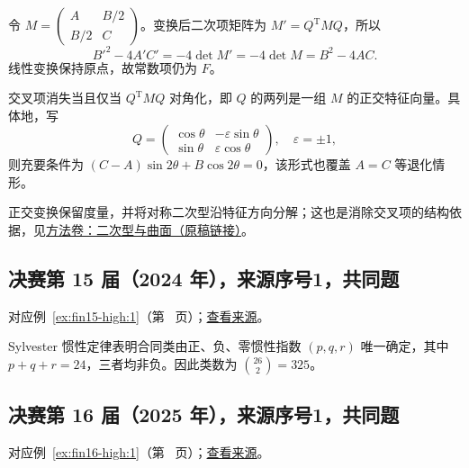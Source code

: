 \documentclass[12pt,fontset=fandol]{ctexart}
\begin{document}
\begin{solve}

令 $M=\begin{pmatrix}A&B/2\\B/2&C\end{pmatrix}$。变换后二次项矩阵为 $M'=Q^{\mathrm T}MQ$，所以
\[
B'^2-4A'C'=-4\det M'=-4\det M=B^2-4AC.
\]
线性变换保持原点，故常数项仍为 $F$。

交叉项消失当且仅当 $Q^{\mathrm T}MQ$ 对角化，即 $Q$ 的两列是一组 $M$ 的正交特征向量。具体地，写
\[
Q=\begin{pmatrix}\cos\theta&-\varepsilon\sin\theta\\
\sin\theta&\varepsilon\cos\theta\end{pmatrix},\quad\varepsilon=\pm1,
\]
则充要条件为 $\boxed{(C-A)\sin2\theta+B\cos2\theta=0}$，该形式也覆盖 $A=C$ 等退化情形。

正交变换保留度量，并将对称二次型沿特征方向分解；这也是消除交叉项的结构依据，见\href{https://github.com/lzxcr/cmc-mathematics/blob/64916fa1fdbc3e444a652eca204d5669058ee321/src/methods/outer/02-geometry.md}{方法卷：二次型与曲面（原稿链接）}。

\end{solve}

\subsection{决赛第 15 届（2024 年），来源序号1，共同题}\label{ans:fin15-high:1}\label{pr:fin15-high:1}

对应例~\ref{ex:fin15-high:1}（第~\pageref{ex:fin15-high:1} 页）；\href{https://github.com/lzxcr/cmc-mathematics/blob/64916fa1fdbc3e444a652eca204d5669058ee321/src/problems/finals/15/01.md}{查看来源}。

\begin{solve}

Sylvester 惯性定律表明合同类由正、负、零惯性指数 $(p,q,r)$ 唯一确定，其中 $p+q+r=24$，三者均非负。因此类数为 $\boxed{\binom{26}{2}=325}$。

\end{solve}

\subsection{决赛第 16 届（2025 年），来源序号1，共同题}\label{ans:fin16-high:1}\label{pr:fin16-high:1}

对应例~\ref{ex:fin16-high:1}（第~\pageref{ex:fin16-high:1} 页）；\href{https://github.com/lzxcr/cmc-mathematics/blob/64916fa1fdbc3e444a652eca204d5669058ee321/src/problems/finals/16/01.md}{查看来源}。
\end{document}
